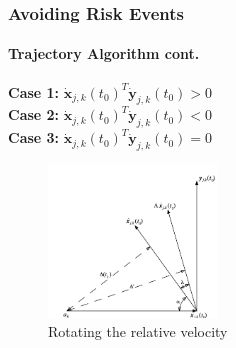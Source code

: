 \documentclass[UKenglish]{beamer}
\begin{document}
\begin{frame}
    \frametitle{Avoiding Risk Events}
    \framesubtitle{Trajectory Algorithm cont.}
    \textbf{Case 1:} $\dot{\boldsymbol{x}}_{j, k}(t_0)^T \dot{\boldsymbol{y}}_{j, k}(t_0) > 0$ \\ \textbf{Case 2:} $\dot{\boldsymbol{x}}_{j, k}(t_0)^T \dot{\boldsymbol{y}}_{j, k}(t_0) < 0$ \\
    \textbf{Case 3:} $\dot{\boldsymbol{x}}_{j, k}(t_0)^T \dot{\boldsymbol{y}}_{j, k}(t_0) = 0$
    \begin{figure}
        \centering
        \includegraphics[width=0.4\textwidth]{MathDept-images/rotation_axis.png}
        \caption{Rotating the relative velocity}
    \end{figure}
\end{frame}
\end{document}
